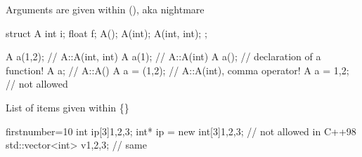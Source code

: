 \begin{frame}[fragile]
  \begin{block}{Arguments are given within (), aka  nightmare}
    \begin{cppcode*}{}
      struct A {
        int i;
        float f;
        A();
        A(int);
        A(int, int);
      };

      A a(1,2);    // A::A(int, int)
      A a(1);      // A::A(int)
      A a();       // declaration of a function!
      A a;         // A::A()
      A a = (1,2); // A::A(int), comma operator!
      A a = {1,2}; // not allowed
    \end{cppcode*}
  \end{block}
\end{frame}

\begin{frame}[fragile]
  \begin{exampleblock}{List of items given within \{\}}
    \begin{cppcode*}{firstnumber=10}
     int ip[3]{1,2,3};
     int* ip = new int[3]{1,2,3}; // not allowed in C++98
     std::vector<int> v{1,2,3};   // same
    \end{cppcode*}
  \end{exampleblock}
\end{frame}
